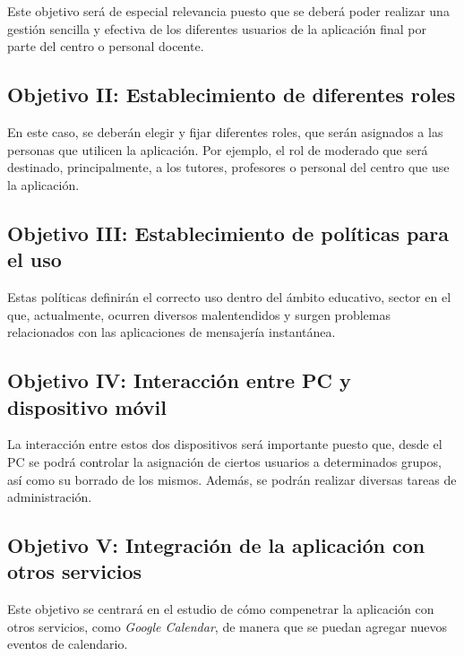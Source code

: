Este objetivo será de especial relevancia puesto que se deberá poder realizar una gestión sencilla y efectiva de los diferentes usuarios de la aplicación final por parte del centro o personal docente.

\newpage

\subsection{Objetivo II: Establecimiento de diferentes roles}

En este caso, se deberán elegir y fijar diferentes roles, que serán asignados a las personas que utilicen la aplicación. Por ejemplo, el rol de moderado que será destinado, principalmente, a los tutores, profesores o personal del centro que use la aplicación.

\subsection{Objetivo III: Establecimiento de políticas para el uso}

Estas políticas definirán el correcto uso dentro del ámbito educativo, sector en el que, actualmente, ocurren diversos malentendidos y surgen problemas relacionados con las aplicaciones de mensajería instantánea.

\subsection{Objetivo IV: Interacción entre PC y dispositivo móvil}

La interacción entre estos dos dispositivos será importante puesto que, desde el PC se podrá controlar la asignación de ciertos usuarios a determinados grupos, así como su borrado de los mismos. Además, se podrán realizar diversas tareas de administración.

\subsection{Objetivo V: Integración de la aplicación con otros servicios}

Este objetivo se centrará en el estudio de cómo compenetrar la aplicación con otros servicios, como \textit{Google Calendar}, de manera que se puedan agregar nuevos eventos de calendario.

